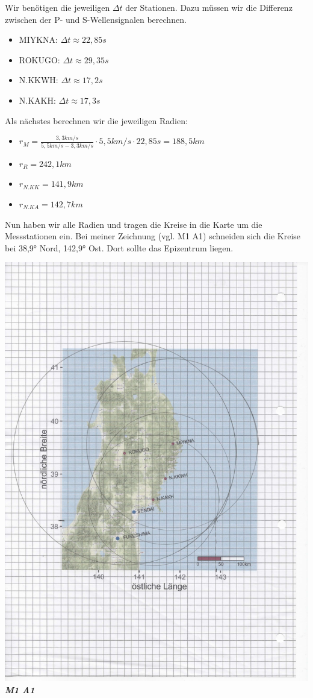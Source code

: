 \documentclass{article}
\begin{document}
Wir benötigen die jeweiligen $\Delta t$ der Stationen. Dazu müssen wir die Differenz zwischen der P- und S-Wellensignalen berechnen.
\begin{itemize}
	\item MIYKNA: $\Delta t \approx 22,85s$ 
	\item ROKUGO: $\Delta t \approx 29,35s$ 
	\item N.KKWH: $\Delta t \approx 17,2s$ 
	\item N.KAKH: $\Delta t \approx 17,3s$ 
\end{itemize}
Als nächstes berechnen wir die jeweiligen Radien: 
\begin{itemize}
	\item $r_M = \frac{3,3km/s}{5,5 km/s - 3,3 km/s} \cdot 5,5 km/s \cdot 22,85 s = 188,5 km$
	\item $r_R = 242,1km$
	\item $r_{N.KK} = 141,9km$
	\item $r_{N.KA} = 142,7km$
\end{itemize}
Nun haben wir alle Radien und tragen die Kreise in die Karte um die Messstationen ein. 
Bei meiner Zeichnung (vgl. M1 A1) schneiden sich die Kreise bei 38,9° Nord, 142,9° Ost. Dort sollte das Epizentrum liegen. 
\begin{center}
	\includegraphics[scale=0.4]{PhotoScan.jpg}\\
	\textit{\textbf{M1 A1}}
\end{center}
\end{document}
